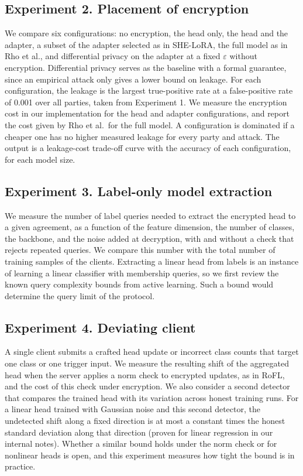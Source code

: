 \documentclass[10pt,a4paper]{article}
\begin{document}
\subsection*{Experiment 2. Placement of encryption}
We compare six configurations: no encryption, the head only, the head and the adapter, a subset of the adapter selected as in SHE-LoRA, the full model as in Rho et al., and differential privacy on the adapter at a fixed $\varepsilon$ without encryption. Differential privacy serves as the baseline with a formal guarantee, since an empirical attack only gives a lower bound on leakage. For each configuration, the leakage is the largest true-positive rate at a false-positive rate of 0.001 over all parties, taken from Experiment 1. We measure the encryption cost in our implementation for the head and adapter configurations, and report the cost given by Rho et al.\ for the full model. A configuration is dominated if a cheaper one has no higher measured leakage for every party and attack. The output is a leakage-cost trade-off curve with the accuracy of each configuration, for each model size.

\subsection*{Experiment 3. Label-only model extraction}
We measure the number of label queries needed to extract the encrypted head to a given agreement, as a function of the feature dimension, the number of classes, the backbone, and the noise added at decryption, with and without a check that rejects repeated queries. We compare this number with the total number of training samples of the clients. Extracting a linear head from labels is an instance of learning a linear classifier with membership queries, so we first review the known query complexity bounds from active learning. Such a bound would determine the query limit of the protocol.

\subsection*{Experiment 4. Deviating client}
A single client submits a crafted head update or incorrect class counts that target one class or one trigger input. We measure the resulting shift of the aggregated head when the server applies a norm check to encrypted updates, as in RoFL, and the cost of this check under encryption. We also consider a second detector that compares the trained head with its variation across honest training runs. For a linear head trained with Gaussian noise and this second detector, the undetected shift along a fixed direction is at most a constant times the honest standard deviation along that direction (proven for linear regression in our internal notes). Whether a similar bound holds under the norm check or for nonlinear heads is open, and this experiment measures how tight the bound is in practice.
\end{document}
